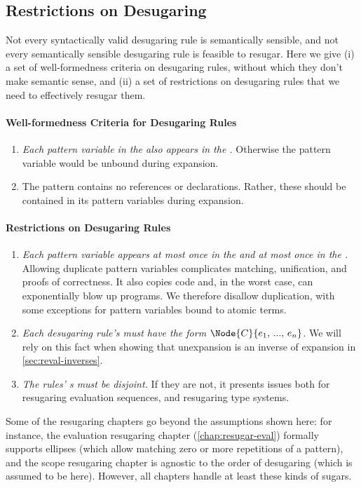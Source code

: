 \subsection{Restrictions on Desugaring}\label{sec:formal-reqs}

Not every syntactically valid desugaring rule is semantically
sensible, and not every semantically sensible desugaring rule is
feasible to resugar. Here we give (i) a set of well-formedness
criteria on desugaring rules, without which they don't make semantic
sense, and (ii) a set of restrictions on desugaring rules that we need
to effectively resugar them.

\paragraph{Well-formedness Criteria for Desugaring Rules}
\begin{enumerate}
\item \emph{Each pattern variable in the  also appears in the
  .} Otherwise the pattern variable would be unbound during
  expansion.
\item The  pattern contains no references or declarations. Rather, these
  should be contained in its pattern variables during expansion.
\end{enumerate}

\paragraph{Restrictions on Desugaring Rules}
\begin{enumerate}
\item \emph{Each pattern variable appears at most once in the  and at
  most once in the .}
  Allowing duplicate pattern variables complicates matching, unification,
  and proofs of correctness. It also copies code
  and, in the worst case, can exponentially blow up programs.
  We therefore disallow duplication,
  with some exceptions for pattern variables bound to atomic terms.
\item \emph{Each desugaring rule's  must have the form
  $\Node{C}{e_1,\,...,\,e_n}$.} We will rely on this fact when showing that
  unexpansion is an inverse of expansion in \cref{sec:reval-inverses}.
\item \emph{The rules' s must be disjoint.} If they
  are not, it presents issues both for resugaring evaluation sequences,
  and resugaring type systems.
\end{enumerate}

Some of the resugaring chapters go beyond the assumptions shown here: for instance, the
evaluation resugaring chapter (\cref{chap:resugar-eval}) formally
supports ellipses (which allow matching zero or more repetitions of a
pattern), and the scope resugaring chapter is agnostic to the order of
desugaring (which is assumed to be  here). However, all
chapters handle at least these kinds of sugars.
